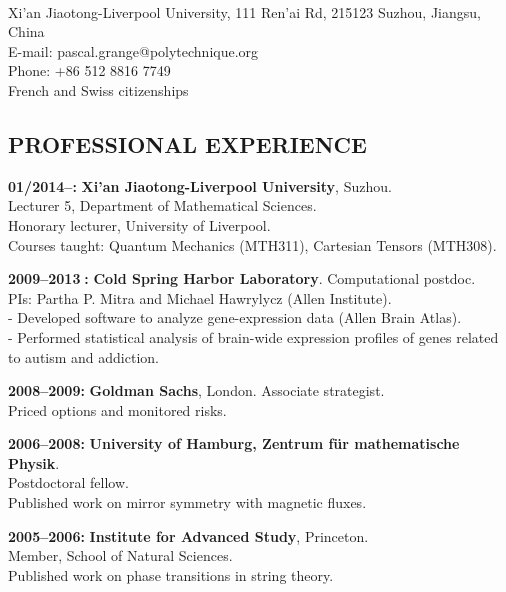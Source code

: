 \documentclass[a4paper, 12pt]{scrartcl}
\begin{document}
\\
Xi'an Jiaotong-Liverpool University, 111 Ren'ai Rd, 215123 Suzhou, Jiangsu, China\\
E-mail: {\ttfamily pascal.grange@polytechnique.org }\\
Phone: +86 512 8816 7749\\
French and Swiss citizenships\\

\thispagestyle{empty}
\vspace {-0.14in}

\subsection*{\sc\bf{PROFESSIONAL EXPERIENCE}}
\begin{list}{name}{ 8em  in \itemsep -.02in}
 \vspace{-.01in}
\item[\bf 01/2014--:]  {\bf{Xi'an Jiaotong-Liverpool University}}, Suzhou.\\
            Lecturer 5, Department of Mathematical Sciences.\\
            Honorary lecturer, University of Liverpool.\\
           Courses taught: Quantum Mechanics (MTH311), Cartesian Tensors (MTH308).\\
\vspace {-.15in}
\item[\bf 2009--2013$\;$:]  {\bf Cold Spring Harbor Laboratory}. Computational postdoc.\\
          PIs: Partha P. Mitra and Michael Hawrylycz (Allen Institute).\\
         - Developed software to analyze gene-expression data (Allen Brain Atlas).\\
         - Performed statistical analysis of brain-wide expression profiles of genes related to autism and addiction.\\  
\vspace {-.15in}
\item[\bf 2008--2009:] {\bf Goldman Sachs}, London. Associate strategist.\\
          Priced options and monitored risks.\\
\vspace {-.15in}
\item[\bf 2006--2008:] {\bf University of Hamburg, Zentrum f\"ur mathematische Physik}.\\
 Postdoctoral fellow.\\
        Published work on mirror symmetry with magnetic fluxes.\\
 \vspace {-.15in}
\item[\bf 2005--2006:] {\bf Institute for Advanced Study}, Princeton.\\
     Member, School of Natural Sciences.\\
    Published work on phase transitions in string theory.\\
\end{list}
\vspace {-0.4in}
\end{document}

